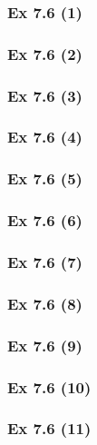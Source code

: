 \subsubsection{Ex 7.6 (1)}\label{sec:Ex_7.6.1}

\subsubsection{Ex 7.6 (2)}\label{sec:Ex_7.6.2}

\subsubsection{Ex 7.6 (3)}\label{sec:Ex_7.6.3}

\subsubsection{Ex 7.6 (4)}\label{sec:Ex_7.6.4}

\subsubsection{Ex 7.6 (5)}\label{sec:Ex_7.6.5}

\subsubsection{Ex 7.6 (6)}\label{sec:Ex_7.6.6}

\subsubsection{Ex 7.6 (7)}\label{sec:Ex_7.6.7}

\subsubsection{Ex 7.6 (8)}\label{sec:Ex_7.6.8}

\subsubsection{Ex 7.6 (9)}\label{sec:Ex_7.6.9}

\subsubsection{Ex 7.6 (10)}\label{sec:Ex_7.6.10}

\subsubsection{Ex 7.6 (11)}\label{sec:Ex_7.6.11}


